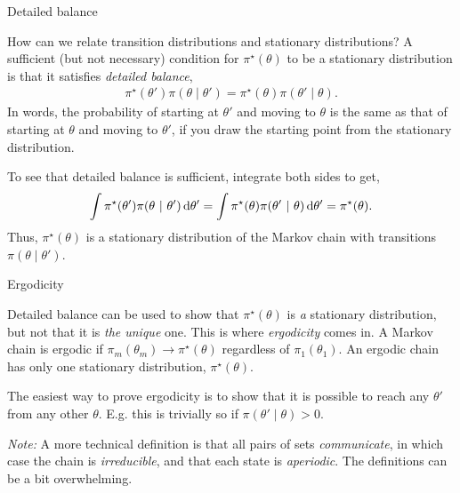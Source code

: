 \documentclass[aspectratio=169]{beamer}
\begin{document}
\begin{frame}[t,allowframebreaks]{Detailed balance}\label{detailed-balance}

How can we relate transition distributions and stationary distributions?
A sufficient (but not necessary) condition for \(\pi^\star(\theta)\) to
be a stationary distribution is that it satisfies \emph{detailed
balance}, \begin{align*}
\pi^\star(\theta') \pi(\theta \mid \theta') = \pi^\star(\theta) \pi(\theta' \mid \theta).
\end{align*} In words, the probability of starting at \(\theta'\) and
moving to \(\theta\) is the same as that of starting at \(\theta\) and
moving to \(\theta'\), if you draw the starting point from the
stationary distribution.

To see that detailed balance is sufficient, integrate both sides to get,
\begin{align*}
\int \pi^\star(\theta') \pi(\theta ~\vert~ \theta') \mathop{}\!\mathrm{d} \theta' = \int \pi^\star(\theta) \pi(\theta' ~\vert~ \theta) \mathop{}\!\mathrm{d} \theta' = \pi^\star(\theta).
\end{align*} Thus, \(\pi^\star(\theta)\) is a stationary distribution of
the Markov chain with transitions \(\pi(\theta \mid \theta')\).
\end{frame}

\begin{frame}[t,allowframebreaks]{Ergodicity}\label{ergodicity}

Detailed balance can be used to show that \(\pi^\star(\theta)\) is
\emph{a} stationary distribution, but not that it is \emph{the unique}
one. This is where \emph{ergodicity} comes in. A Markov chain is ergodic
if \(\pi_m(\theta_m) \to \pi^\star(\theta)\) regardless of
\(\pi_1(\theta_1)\). An ergodic chain has only one stationary
distribution, \(\pi^\star(\theta)\).

The easiest way to prove ergodicity is to show that it is possible to
reach any \(\theta'\) from any other \(\theta\). E.g. this is trivially
so if \(\pi(\theta' \mid \theta) > 0\).

\textit{Note:} A more technical definition is that all pairs of
sets \emph{communicate}, in which case the chain is \emph{irreducible},
and that each state is \emph{aperiodic}. The definitions can be a bit
overwhelming. 
\end{frame}
\end{document}

